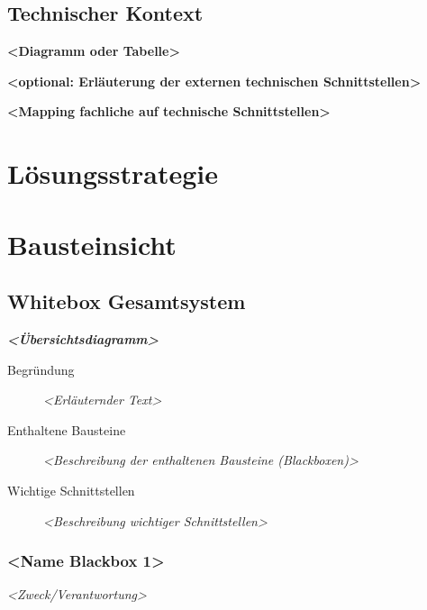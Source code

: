 \documentclass[
]{article}
\begin{document}
\hypertarget{_technischer_kontext}{%
  \subsection{Technischer Kontext}\label{_technischer_kontext}}

\textbf{\textless Diagramm oder Tabelle\textgreater{}}

\textbf{\textless optional: Erläuterung der externen technischen
  Schnittstellen\textgreater{}}

\textbf{\textless Mapping fachliche auf technische
  Schnittstellen\textgreater{}}

\hypertarget{section-solution-strategy}{%
  \section{Lösungsstrategie}\label{section-solution-strategy}}

\hypertarget{section-building-block-view}{%
  \section{Bausteinsicht}\label{section-building-block-view}}

\hypertarget{_whitebox_gesamtsystem}{%
  \subsection{Whitebox Gesamtsystem}\label{_whitebox_gesamtsystem}}

\emph{\textbf{\textless Übersichtsdiagramm\textgreater{}}}

\begin{description}
  \item[Begründung]
    \emph{\textless Erläuternder Text\textgreater{}}
  \item[Enthaltene Bausteine]
    \emph{\textless Beschreibung der enthaltenen Bausteine
      (Blackboxen)\textgreater{}}
  \item[Wichtige Schnittstellen]
    \emph{\textless Beschreibung wichtiger Schnittstellen\textgreater{}}
\end{description}

\hypertarget{__name_blackbox_1}{%
  \subsubsection{\textless Name Blackbox
    1\textgreater{}}\label{__name_blackbox_1}}

\emph{\textless Zweck/Verantwortung\textgreater{}}
\end{document}
